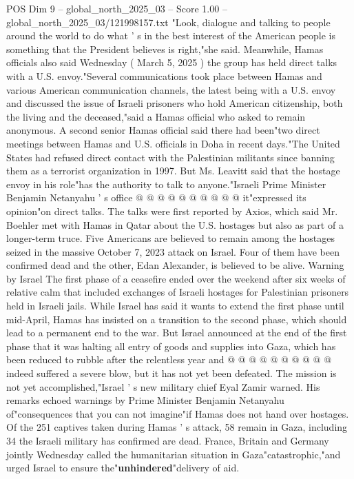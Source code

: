 \begin{textsample}{POS Dim 9 – global\_north\_2025\_03 – Score 1.00 – global\_north\_2025\_03/121998157.txt}  \label{ex:f9_pos_385}
"Look, dialogue and talking to people around the world to do what ' s in the best interest of the American people is something that the President believes is right,"she said.
Meanwhile, Hamas officials also said Wednesday ( March 5, 2025 ) the group has held direct talks with a U.S. envoy."Several communications took place between Hamas and various American communication channels, the latest being with a U.S. envoy and discussed the issue of Israeli prisoners who hold American citizenship, both the living and the deceased,"said a Hamas official who asked to remain anonymous.
A second senior Hamas official said there had been"two direct meetings between Hamas and U.S. officials in Doha in recent days."The United States had refused direct contact with the Palestinian militants since banning them as a terrorist organization in 1997.
But Ms.
Leavitt said that the hostage envoy in his role"has the authority to talk to anyone."Israeli Prime Minister Benjamin Netanyahu ' s office @ @ @ @ @ @ @ @ @ @ it"expressed its opinion"on direct talks.
The talks were first reported by Axios, which said Mr.
Boehler met with Hamas in Qatar about the U.S. hostages but also as part of a longer-term truce.
Five Americans are believed to remain among the hostages seized in the massive October 7, 2023 attack on Israel.
Four of them have been confirmed dead and the other, Edan Alexander, is believed to be alive.
Warning by Israel The first phase of a ceasefire ended over the weekend after six weeks of relative calm that included exchanges of Israeli hostages for Palestinian prisoners held in Israeli jails.
While Israel has said it wants to extend the first phase until mid-April, Hamas has insisted on a transition to the second phase, which should lead to a permanent end to the war.
But Israel announced at the end of the first phase that it was halting all entry of goods and supplies into Gaza, which has been reduced to rubble after the relentless year and @ @ @ @ @ @ @ @ @ @ indeed suffered a severe blow, but it has not yet been defeated.
The mission is not yet accomplished,"Israel ' s new military chief Eyal Zamir warned.
His remarks echoed warnings by Prime Minister Benjamin Netanyahu of"consequences that you can not imagine"if Hamas does not hand over hostages.
Of the 251 captives taken during Hamas ' s attack, 58 remain in Gaza, including 34 the Israeli military has confirmed are dead.
France, Britain and Germany jointly Wednesday called the humanitarian situation in Gaza"catastrophic,"and urged Israel to ensure the"\textbf{unhindered}"delivery of aid.

\end{textsample}
